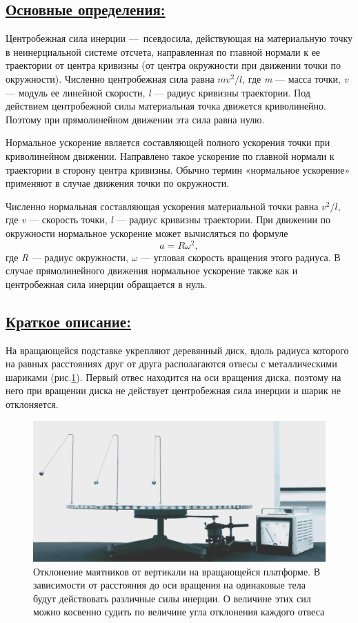\documentclass[14pt,a4paper,oneside]{extarticle}	%
\begin{document}
	\newpage
	\subsection*{\underline{Основные определения:}}
		
		Центробежная сила инерции — псевдосила, действующая на материальную точку в неинерциальной системе отсчета, 
		направленная по главной нормали к ее траектории от центра кривизны 
		(от центра окружности при движении точки по окружности).
		Численно центробежная сила равна $ mv^2/l $, где \textit{m} — масса точки, \textit{v} — модуль ее линейной скорости, \textit{l} — радиус кривизны траектории.
		Под действием центробежной силы материальная точка движется криволинейно. 
		Поэтому при прямолинейном движении эта сила равна нулю.
		
		Нормальное ускорение является составляющей полного ускорения точки при криволинейном движении.
		Направлено такое ускорение по главной нормали к траектории в сторону центра кривизны.
		Обычно термин «нормальное ускорение» применяют в случае движения точки по окружности.
		
		Численно нормальная составляющая ускорения материальной точки равна $ v^2/l $, где \textit{v} — скорость точки, \textit{l} — радиус кривизны траектории.
		При движении по окружности нормальное ускорение может вычисляться по формуле $$ a = R\omega^2, $$ где \textit{R} — радиус окружности, $ \omega $ — угловая скорость вращения этого радиуса. 
		В случае прямолинейного движения нормальное ускорение также как и центробежная сила инерции обращается в нуль.

	\newpage
\subsection*{\underline{Краткое описание:}}
			
На вращающейся подставке укрепляют деревянный диск, вдоль радиуса которого на равных расстояниях друг от друга располагаются отвесы с металлическими шариками (рис.\ref{platform-2}).
Первый отвес находится на оси вращения диска, поэтому на него при вращении диска не действует центробежная сила инерции и шарик не отклоняется.
\begin{figure}[H] 
\centering 		
\includegraphics[width=0.9\linewidth]{platform-2.png} 
\caption{Отклонение маятников от вертикали на вращающейся платформе. В зависимости от расстояния до оси вращения на одинаковые тела будут действовать различные силы инерции. О величине этих сил можно косвенно судить по величине угла отклонения каждого отвеса}
\label{platform-2}
\end{figure}
	
\end{document}

